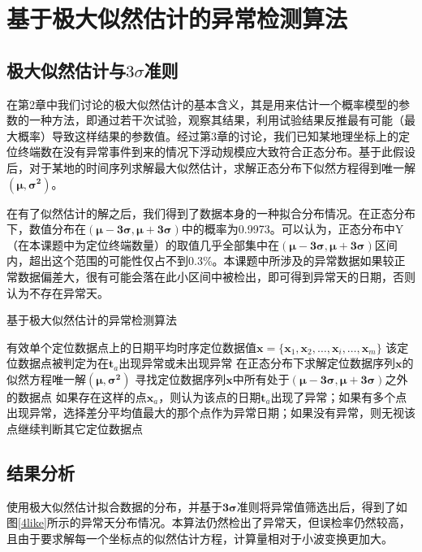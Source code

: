 \documentclass[a4paper,AutoFakeBold,oneside,12pt]{book}
\begin{document}
\section{基于极大似然估计的异常检测算法}
\subsection{极大似然估计与$3\sigma$准则}
	在第2章中我们讨论的极大似然估计的基本含义，其是用来估计一个概率模型的参数的一种方法，即通过若干次试验，观察其结果，利用试验结果反推最有可能（最大概率）导致这样结果的参数值。经过第3章的讨论，我们已知某地理坐标上的定位终端数在没有异常事件到来的情况下浮动规模应大致符合正态分布。基于此假设后，对于某地的时间序列求解最大似然估计，求解正态分布下似然方程得到唯一解$\bm{(\mu,\sigma^2)}$。

	在有了似然估计的解之后，我们得到了数据本身的一种拟合分布情况。在正态分布下，数值分布在$\bm{(\mu-3\sigma,\mu+3\sigma)}$中的概率为0.9973。可以认为，正态分布中Y（在本课题中为定位终端数量）的取值几乎全部集中在$\bm{(\mu-3\sigma,\mu+3\sigma)}$区间内，超出这个范围的可能性仅占不到0.3\%。本课题中所涉及的异常数据如果较正常数据偏差大，很有可能会落在此小区间中被检出，即可得到异常天的日期，否则认为不存在异常天。

\begin{algorithm} 
\caption{基于极大似然估计的异常检测算法} 
\label{a44}
\renewcommand{\algorithmicrequire}{\textbf{输入：}}
\renewcommand{\algorithmicensure}{\textbf{输出：}} 
\begin{algorithmic}[1] 
\Require 有效单个定位数据点上的日期平均时序定位数据值$\bm{x}=\{\bm{x}_1,\bm{x}_2,\ldots,\bm{x}_i,\ldots,\bm{x}_m\}$
\Ensure 该定位数据点被判定为在$\bm{t}_a$出现异常或未出现异常
\State  在正态分布下求解定位数据序列$\bm{x}$的似然方程唯一解$\bm{(\mu,\sigma^2)}$
\State  寻找定位数据序列$\bm{x}$中所有处于$\bm{(\mu-3\sigma,\mu+3\sigma)}$之外的数据点
\State 如果存在这样的点$\bm{x}_a$，则认为该点的日期$\bm{t}_a$出现了异常；如果有多个点出现异常，选择差分平均值最大的那个点作为异常日期；如果没有异常，则无视该点继续判断其它定位数据点
\end{algorithmic}  
\end{algorithm}

\subsection{结果分析}
	使用极大似然估计拟合数据的分布，并基于$\bm{3\sigma}$准则将异常值筛选出后，得到了如图\ref{4like}所示的异常天分布情况。本算法仍然检出了异常天，但误检率仍然较高，且由于要求解每一个坐标点的似然估计方程，计算量相对于小波变换更加大。
\end{document}
